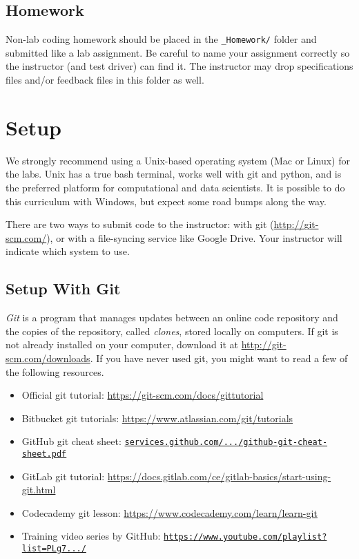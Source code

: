 \subsection*{Homework}

Non-lab coding homework should be placed in the \texttt{\_Homework/} folder and submitted like a lab assignment.
Be careful to name your assignment correctly so the instructor (and test driver) can find it.
The instructor may drop specifications files and/or feedback files in this folder as well.

\section*{Setup} %

\begin{warn}
We strongly recommend using a Unix-based operating system (Mac or Linux) for the labs.
Unix has a true bash terminal, works well with git and python, and is the preferred platform for computational and data scientists.
It is possible to do this curriculum with Windows, but expect some road bumps along the way.
\end{warn}

There are two ways to submit code to the instructor: with git (\url{http://git-scm.com/}), or with a file-syncing service like Google Drive.
Your instructor will indicate which system to use.

\subsection*{Setup With Git} %

\emph{Git} is a program that manages updates between an online code repository and the copies of the repository, called \emph{clones}, stored locally on computers.
If git is not already installed on your computer, download it at \url{http://git-scm.com/downloads}.
If you have never used git, you might want to read a few of the following resources.
\begin{itemize}
\item Official git tutorial: \url{https://git-scm.com/docs/gittutorial}
\item Bitbucket git tutorials: \url{https://www.atlassian.com/git/tutorials}
\item GitHub git cheat sheet: \href{https://services.github.com/on-demand/downloads/github-git-cheat-sheet.pdf}{\texttt{services.github.com/.../github-git-cheat-sheet.pdf}}
\item GitLab git tutorial: \url{https://docs.gitlab.com/ce/gitlab-basics/start-using-git.html}
\item Codecademy git lesson: \url{https://www.codecademy.com/learn/learn-git}
\item Training video series by GitHub: \href{https://www.youtube.com/playlist?list=PLg7s6cbtAD15G8lNyoaYDuKZSKyJrgwB-}{\texttt{https://www.youtube.com/playlist?list=PLg7.../}}
\end{itemize}

